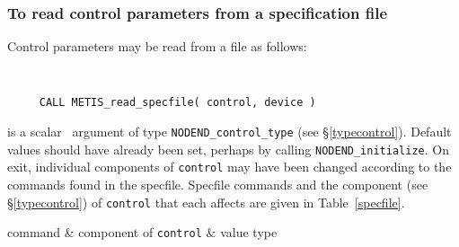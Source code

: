 \documentclass{galahad}
\newcommand{\packagename}{NODEND}
\begin{document}
\subsubsection{To read control parameters from a specification file}
\label{readspec}

Control parameters may be read from a file as follows:
\hskip0.5in

\def\baselinestretch{0.8}
{\tt
\begin{verbatim}
     CALL METIS_read_specfile( control, device )
\end{verbatim}
}
\def\baselinestretch{1.0}

\begin{description}
 is a scalar \intentinout\ argument of type
{\tt \packagename\_control\_type}
(see \S\ref{typecontrol}).
Default values should have already been set, perhaps by calling
{\tt \packagename\_initialize}.
On exit, individual components of {\tt control} may have been changed
according to the commands found in the specfile. Specfile commands and
the component (see \S\ref{typecontrol}) of {\tt control}
that each affects are given in Table~\ref{specfile}.

\hline
  command & component of {\tt control} & value type \\
\hline



\end{description}
\end{document}

